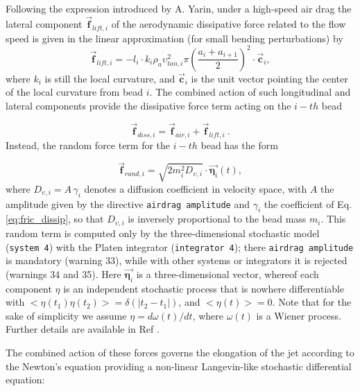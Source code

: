 Following the expression introduced by A. Yarin\cite{yarin1993free,yarin2014fundamentals},
under a high-speed air drag the lateral component $\vec{\textbf{f}}_{lift,i}$
of the aerodynamic dissipative force related to the flow speed is
given in the linear approximation (for small bending perturbations)
by
\begin{equation}
\vec{\textbf{f}}_{lift,i}=-l_{i}\cdot k_{i}\rho_{a}\upsilon_{tan,i}^{2}\pi\left(\frac{a_{i}+a_{i+1}}{2}\right)^{2}\cdot\vec{\textbf{c}}_{i},
\end{equation}
where $k_{i}$ is still the local curvature, and $\vec{\textbf{c}}_{i}$
is the unit vector pointing the center of the local curvature from
bead $i$. The combined action of such longitudinal and lateral components
provide the dissipative force term acting on the $i-th$ bead

\begin{equation}
\vec{\textbf{f}}_{diss,i}=\vec{\textbf{f}}_{air,i}+\vec{\textbf{f}}_{lift,i}\:.
\end{equation}
Instead, the random force term for the $i-th$ bead has the form

\begin{equation}
\vec{\textbf{f}}_{rand,i}=\sqrt{2m_{i}^{2}D_{\upsilon,i}}\cdot\vec{\boldsymbol{\eta}_{i}}(t),
\end{equation}
where $D_{\upsilon,i}=A\,\gamma_{i}$ denotes a diffusion coefficient in velocity
space, with $A$ the amplitude given by the directive \texttt{airdrag amplitude}
and $\gamma_{i}$ the coefficient of Eq. \ref{eq:fric_dissip}, so that
$D_{\upsilon,i}$ is inversely proportional to the bead mass $m_{i}$.
This random term is computed only by the three-dimensional stochastic
model (\texttt{system 4}) with the Platen integrator (\texttt{integrator 4});
there \texttt{airdrag amplitude} is mandatory (warning 33), while with
other systems or integrators it is rejected (warnings 34 and 35).
Here $\vec{\boldsymbol{\eta}_{i}}$ is a three-dimensional vector, whereof
each component $\eta$ is an independent stochastic process that is
nowhere differentiable with $<\eta\left(t_{1}\right)\eta\left(t_{2}\right)>=\delta\left(\left|t_{2}-t_{1}\right|\right)$,
and $<\eta\left(t\right)>=0$. Note that for the sake of simplicity
we assume $\eta=d\omega(t)/dt$, where $\omega(t)$ is a Wiener process.
Further details are available in Ref \cite{lauricella2016flow}.

The combined action of these forces governs the elongation of the
jet according to the Newton's equation providing a non-linear Langevin-like
stochastic differential equation:

